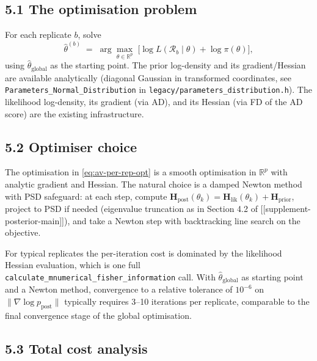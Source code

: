 \documentclass[11pt]{article}
\begin{document}
\subsection*{5.1 The optimisation problem}

For each replicate $b$, solve
\begin{equation}
\widehat\theta^{(b)}
\;=\;
\arg\max_{\theta\in\mathbb R^p}\;\bigl[\log L(\mathcal R_b\mid\theta) + \log\pi(\theta)\bigr],
\label{eq:av-per-rep-opt}
\end{equation}
using $\widehat\theta_{\mathrm{global}}$ as the starting point. The
prior log-density and its gradient/Hessian are available analytically
(diagonal Gaussian in transformed coordinates, see
\texttt{Parameters\_Normal\_Distribution} in
\texttt{legacy/parameters\_distribution.h}). The likelihood log-density,
its gradient (via AD), and its Hessian (via FD of the AD score) are
the existing infrastructure.

\subsection*{5.2 Optimiser choice}

The optimisation in \eqref{eq:av-per-rep-opt} is a smooth optimisation
in $\mathbb R^p$ with analytic gradient and Hessian. The natural choice
is a damped Newton method with PSD safeguard: at each step, compute
$\mathbf H_{\mathrm{post}}(\theta_k) = \mathbf H_{\mathrm{lik}}(\theta_k) + \mathbf H_{\mathrm{prior}}$,
project to PSD if needed (eigenvalue truncation as in Section 4.2 of
[[supplement-posterior-main]]), and take a Newton step with
backtracking line search on the objective.

For typical replicates the per-iteration cost is dominated by the
likelihood Hessian evaluation, which is one full
\texttt{calculate\_mnumerical\_fisher\_information} call. With
$\widehat\theta_{\mathrm{global}}$ as starting point and a Newton method,
convergence to a relative tolerance of $10^{-6}$ on $\|\nabla\log p_{\mathrm{post}}\|$
typically requires 3--10 iterations per replicate, comparable to the
final convergence stage of the global optimisation.

\subsection*{5.3 Total cost analysis}
\end{document}

